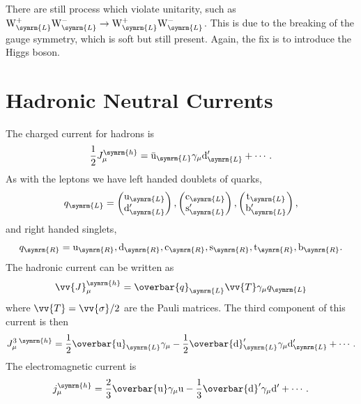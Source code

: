 \documentclass[fleqn]{NotesClass}
\newcommand{\Pparticle}[1]{\mathrm{#1}}
\newcommand{\Pu}{\ensuremath{\Pparticle{u}}}
\newcommand{\Pd}{\ensuremath{\Pparticle{d}}}
\newcommand{\Ps}{\ensuremath{\Pparticle{s}}}
\newcommand{\Pc}{\ensuremath{\Pparticle{c}}}
\newcommand{\Pt}{\ensuremath{\Pparticle{t}}}
\newcommand{\Pb}{\ensuremath{\Pparticle{b}}}
\newcommand{\PW}{\ensuremath{\Pparticle{W}}}
\newcommand{\APantiparticle}[1]{\bar{#1}}
\newcommand{\APu}{\ensuremath{\APantiparticle{\Pparticle{u}}}}
\newcommand{\diracadjoint}[1]{\overbar{#1}}
\newcommand{\Left}{\symrm{L}}
\newcommand{\Right}{\symrm{R}}
\begin{document}
    There are still process which violate unitarity, such as \(\PW^+_{\Left} \PW^-_{\Left} \to \PW^+_{\Left}\PW^-_{\Left}\).
    This is due to the breaking of the gauge symmetry, which is soft but still present.
    Again, the fix is to introduce the Higgs boson.
    
    \section{Hadronic Neutral Currents}
    The charged current for hadrons is
    \begin{equation}
        \frac{1}{2}J_\mu^{\symrm{h}} = \APu_{\Left} \gamma_\mu \Pd_{\Left}' + \dotsb.
    \end{equation}
    As with the leptons we have left handed doublets of quarks,
    \begin{equation}
        q_{\Left} = 
        \begin{pmatrix}
            \Pu_{\Left}\\ \Pd'_{\Left}
        \end{pmatrix}
        ,
        \begin{pmatrix}
            \Pc_{\Left}\\ \Ps'_{\Left}
        \end{pmatrix}
        ,
        \begin{pmatrix}
            \Pt_{\Left}\\ \Pb'_{\Left}
        \end{pmatrix}
        ,
    \end{equation}
    and right handed singlets,
    \begin{equation}
        q_{\Right} = \Pu_{\Right}, \Pd_{\Right}, \Pc_{\Right}, \Ps_{\Right}, \Pt_{\Right}, \Pb_{\Right}.
    \end{equation}
    The hadronic current can be written as
    \begin{equation}
        \vv{J}_\mu^{\symrm{h}} = \diracadjoint{q}_{\Left} \vv{T} \gamma_\mu q_{\Left}
    \end{equation}
    where \(\vv{T} = \vv{\sigma}/2\) are the Pauli matrices.
    The third component of this current is then
    \begin{equation}
        J_\mu^{3\;\symrm{h}} = \frac{1}{2}\diracadjoint{\Pu}_{\Left}\gamma_\mu - \frac{1}{2}\diracadjoint{\Pd}'_{\Left}\gamma_\mu \Pd'_{\Left} + \dotsb.
    \end{equation}
    The electromagnetic current is
    \begin{equation}
        j_\mu^{\symrm{h}} = \frac{2}{3}\diracadjoint{\Pu}\gamma_\mu \Pu - \frac{1}{3}\diracadjoint{\Pd}'\gamma_\mu\Pd' + \dotsb.
    \end{equation}
\end{document}
